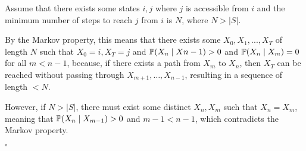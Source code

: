 \begin{solution}

    Assume that there exists some states $i,j$ where $j$ is accessible
    from $i$ and the minimum number of steps to reach $j$ from $i$ is
    $N$, where $N > |S|$.

    By the Markov property, this means that there exists some $X_0,
    X_1,...,X_T$ of length $N$ such that $X_0 = i, X_T=j$ and ${\mathbb P}(X_n
    \mid X{n-1}) > 0$ and ${\mathbb P}(X_n \mid X_m) = 0$ for all $m < n - 1$,
    because, if there exists a path from $X_m$ to $X_n$, then $X_T$ can
    be reached without passing through $X_{m+1},\ldots,X_{n-1}$,
    resulting in a sequence of length $<N$.

    However, if $N > |S|$, there must exist some distinct $X_n,X_m$ such
    that $X_n=X_m$, meaning that ${\mathbb P}(X_n \mid X_{m-1}) > 0$ and $m -
    1 < n -1$, which contradicts the Markov property.

    \raggedleft $\square$

\end{solution}
